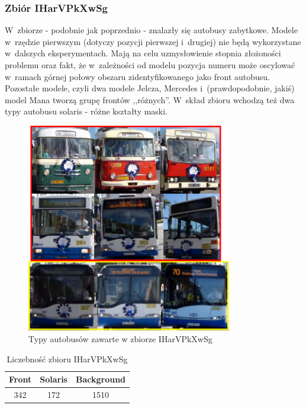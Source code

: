 \subsubsection{Zbiór IHarVPkXwSg}

W~zbiorze - podobnie jak poprzednio - znalazły się autobusy zabytkowe.
Modele w~rzędzie pierwszym (dotyczy pozycji pierwszej i~drugiej) nie 
będą wykorzystane w~dalszych eksperymentach. Mają na celu uzmysłowienie
stopnia złożoności problemu oraz fakt, że w~zależności od modelu pozycja
numeru może oscylować w~ramach górnej połowy obszaru zidentyfikowanego
jako front autobusu. Pozostałe modele, czyli
dwa modele Jelcza, Mercedes i~(prawdopodobnie, jakiś) model Mana tworzą
grupę frontów ,,różnych''. W~skład zbioru wchodzą też dwa typy autobusu
solaris - różne kształty maski.

\begin{figure}[!h]
    \centering
    \includegraphics[width=0.8\textwidth]{img/exp_trainig_data_IHa}
    \caption{Typy autobusów zawarte w zbiorze IHarVPkXwSg}
    \label{fig:IHarVPkXwSg_types}
\end{figure}

\begin{table}[!h]
    \centering
    \begin{tabular}{c|c|c}
        Front   & Solaris   & Background \\ \hline
        342     & 172       & 1510
    \end{tabular}
    \caption{Liczebność zbioru IHarVPkXwSg}
    \label{tab:IHarVPkXwSg_count}
\end{table}

